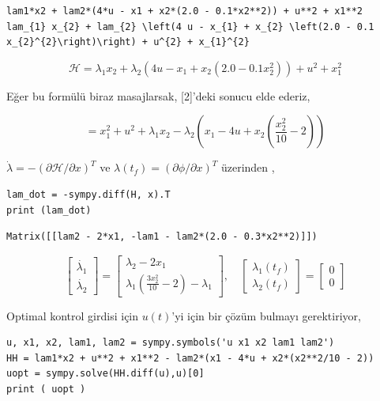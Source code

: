 \documentclass[12pt,fleqn]{article}\usepackage{../../common}
\begin{document}
\begin{verbatim}
lam1*x2 + lam2*(4*u - x1 + x2*(2.0 - 0.1*x2**2)) + u**2 + x1**2
lam_{1} x_{2} + lam_{2} \left(4 u - x_{1} + x_{2} \left(2.0 - 0.1 x_{2}^{2}\right)\right) + u^{2} + x_{1}^{2}
\end{verbatim}


$$
\mathcal{H} = \lambda_{1} x_{2} + \lambda_{2} \left(4 u - x_{1} + x_{2} \left(2.0 - 0.1
x_{2}^{2}\right)\right) + u^{2} + x_{1}^{2}
$$

Eğer bu formülü biraz masajlarsak, [2]'deki sonucu elde ederiz,

$$
= x_1^2 + u^2 + \lambda_1 x_2 - \lambda_2
\left( x_1 - 4u + x_2 \left( \frac{x_2^2}{10} - 2 \right)  \right)
$$

$\dot{\lambda} = -(\partial \mathcal{H} / \partial x)^T$ ve  $\lambda(t_f) = (\partial \phi / \partial x)^T$ üzerinden ,

\begin{verbatim}
lam_dot = -sympy.diff(H, x).T
print (lam_dot)
\end{verbatim}

\begin{verbatim}
Matrix([[lam2 - 2*x1, -lam1 - lam2*(2.0 - 0.3*x2**2)]])
\end{verbatim}


$$
\left[\begin{array}{c}
\dot{\lambda_1} \\ \dot{\lambda_2} 
\end{array}\right] =
\left[\begin{array}{c}
\lambda_2 - 2 x_1 \\
\lambda_1 \left( \frac{3 x_2^2}{10} - 2  \right) - \lambda_1
\end{array}\right],
\quad
\left[\begin{array}{c}
\lambda_1(t_f) \\ \lambda_2(t_f) 
\end{array}\right] =
\left[\begin{array}{c}
0 \\ 0
\end{array}\right]
$$

Optimal kontrol girdisi için $u(t)$'yi için bir çözüm bulmayı gerektiriyor,

\begin{verbatim}
u, x1, x2, lam1, lam2 = sympy.symbols('u x1 x2 lam1 lam2')
HH = lam1*x2 + u**2 + x1**2 - lam2*(x1 - 4*u + x2*(x2**2/10 - 2))
uopt = sympy.solve(HH.diff(u),u)[0]
print ( uopt )
\end{verbatim}
\end{document}
